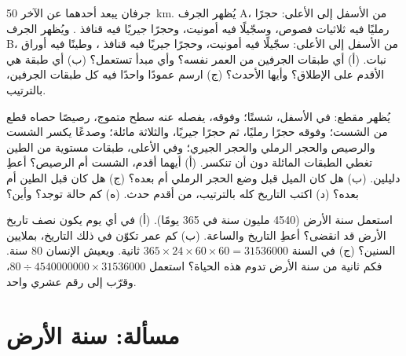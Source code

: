 \begin{exercise}[$\star\star$]\label{exo:g7:geological-time:10}
جرفان يبعد أحدهما عن الآخر \qty{50}{km}. يُظهر الجرف A، من الأسفل إلى
الأعلى: حجرًا رمليًا فيه ثلاثيات فصوص، وسجّيلًا فيه أمونيت، وحجرًا جيريًا فيه
قنافذ . ويُظهر الجرف B، من الأسفل إلى الأعلى: سجّيلًا فيه أمونيت،
وحجرًا جيريًا فيه قنافذ ، وطينًا فيه أوراق نبات. (أ) أي طبقات الجرفين من
العمر نفسه؟ وأي مبدأ تستعمل؟ (ب) أي طبقة هي الأقدم على الإطلاق؟ وأيها
الأحدث؟ (ج) ارسم عمودًا واحدًا فيه كل طبقات الجرفين، بالترتيب.
\end{exercise}

\begin{exercise}[$\star\star\star$]\label{exo:g7:geological-time:11}
يُظهر مقطع: في الأسفل، شستًا؛ وفوقه، يفصله عنه سطح  متموج، رصيصًا
حصاه قطع من الشست؛ وفوقه حجرًا رمليًا، ثم حجرًا جيريًا، والثلاثة مائلة؛
وصدعًا يكسر الشست والرصيص والحجر الرملي والحجر الجيري؛ وفي الأعلى، طبقات
مستوية من الطين تغطي الطبقات المائلة  دون أن تنكسر. (أ) أيهما أقدم،
الشست أم الرصيص؟ أعطِ دليلين. (ب) هل كان الميل قبل وضع الحجر الرملي أم
بعده؟ (ج) هل كان  قبل الطين أم بعده؟ (د) اكتب التاريخ كله بالترتيب،
من أقدم حدث. (ه) كم حالة  توجد؟ وأين؟
\end{exercise}

\begin{exercise}[$\star\star\star$]\label{exo:g7:geological-time:12}
استعمل سنة الأرض (\num{4540} مليون سنة في 365 يومًا). (أ) في أي يوم يكون
نصف تاريخ الأرض قد انقضى؟ أعطِ التاريخ والساعة. (ب) كم عمر  تكوّن في ذلك
التاريخ، بملايين السنين؟ (ج) في السنة $365 \times 24 \times 60 \times 60 = \num{31536000}$
ثانية. ويعيش الإنسان 80 سنة. فكم ثانية من سنة الأرض تدوم هذه الحياة؟
استعمل $80 \div \num{4540000000} \times
\num{31536000}$، وقرّب إلى رقم عشري واحد.
\end{exercise}

\section{مسألة: سنة الأرض}

